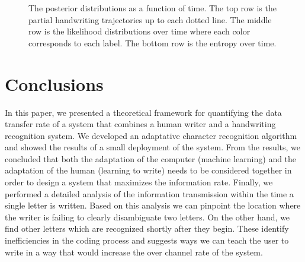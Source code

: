 \documentclass{sigchi}
\begin{document}
\begin{figure}
\begin{subfigure}[b]{0.25\textwidth}
    \caption{}
    \label{fig:entropy_y}
  \end{subfigure}
  \caption{The posterior distributions as a function of time. The top
    row is the partial handwriting trajectories up to each dotted
    line. The middle row is the likelihood distributions over time
    where each color corresponds to each label. The bottom row is the
    entropy over time. }
  \label{fig:entropy}
\end{figure}


\section{Conclusions}
\label{sec:conclusions}

In this paper, we presented a theoretical framework for quantifying
the data transfer rate of a system that combines a human writer and a
handwriting recognition system. We developed an adaptative character
recognition algorithm and showed the results of a small deployment of
the system. From the results, we concluded that both the adaptation of
the computer (machine learning) and the adaptation of the human
(learning to write) needs to be considered together in order to design
a system that maximizes the information rate. Finally, we performed a
detailed analysis of the information transmission within the time a
single letter is written. Based on this analysis we can pinpoint the
location where the writer is failing to clearly disambiguate two
letters. On the other hand, we find other letters which are recognized
shortly after they begin. These identify inefficiencies in the coding
process and suggests ways we can teach the user to write in a way that
would increase the over channel rate of the system.


%
%
%
%
%
\balance



\end{document}
